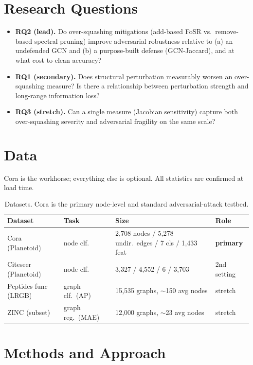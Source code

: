 \documentclass[11pt]{article}
\begin{document}
\section{Research Questions}
\begin{itemize}
  \item \textbf{RQ2 (lead).} Do over-squashing mitigations (add-based FoSR vs.\ remove-based spectral pruning)
  improve adversarial robustness relative to (a) an undefended GCN and (b) a purpose-built defense
  (GCN-Jaccard), and at what cost to clean accuracy?
  \item \textbf{RQ1 (secondary).} Does structural perturbation measurably worsen an over-squashing measure?
  Is there a relationship between perturbation strength and long-range information loss?
  \item \textbf{RQ3 (stretch).} Can a single measure (Jacobian sensitivity) capture both over-squashing
  severity and adversarial fragility on the same scale?
\end{itemize}

\section{Data}
Cora is the workhorse; everything else is optional. All statistics are confirmed at load time.

\begin{table}[t]
\centering\small
\begin{tabular}{@{}llll@{}}
\toprule
\textbf{Dataset} & \textbf{Task} & \textbf{Size} & \textbf{Role} \\
\midrule
Cora (Planetoid)     & node clf.         & 2{,}708 nodes / 5{,}278 undir.\ edges / 7 cls / 1{,}433 feat & \textbf{primary} \\
Citeseer (Planetoid) & node clf.         & 3{,}327 / 4{,}552 / 6 / 3{,}703                              & 2nd setting \\
Peptides-func (LRGB) & graph clf.\ (AP)  & 15{,}535 graphs, $\sim$150 avg nodes                         & stretch \\
ZINC (subset)        & graph reg.\ (MAE) & 12{,}000 graphs, $\sim$23 avg nodes                          & stretch \\
\bottomrule
\end{tabular}
\caption{Datasets. Cora is the primary node-level and standard adversarial-attack testbed.}
\end{table}

\section{Methods and Approach}
\end{document}
